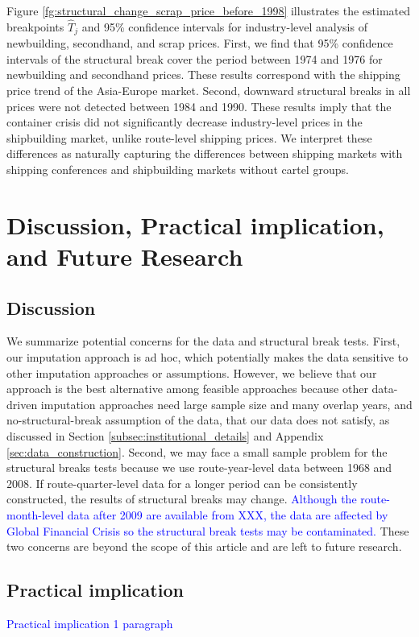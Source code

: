 \documentclass[11pt]{article}
\begin{document}
Figure \ref{fg:structural_change_scrap_price_before_1998} illustrates the estimated breakpoints $\hat{T}_j$ and 95\% confidence intervals for industry-level analysis of newbuilding, secondhand, and scrap prices. First, we find that 95\% confidence intervals of the structural break cover the period between 1974 and 1976 for newbuilding and secondhand prices. These results correspond with the shipping price trend of the Asia-Europe market. Second, downward structural breaks in all prices were not detected between 1984 and 1990. These results imply that the container crisis did not significantly decrease industry-level prices in the shipbuilding market, unlike route-level shipping prices. We interpret these differences as naturally capturing the differences between shipping markets with shipping conferences and shipbuilding markets without cartel groups.

\section{Discussion, Practical implication, and Future Research}

\subsection{Discussion}
We summarize potential concerns for the data and structural break tests. 
First, our imputation approach is ad hoc, which potentially makes the data sensitive to other imputation approaches or assumptions. 
However, we believe that our approach is the best alternative among feasible approaches because other data-driven imputation approaches need large sample size and many overlap years, and no-structural-break assumption of the data, that our data does not satisfy, as discussed in Section \ref{subsec:institutional_details} and Appendix \ref{sec:data_construction}. 
Second, we may face a small sample problem for the structural breaks tests because we use route-year-level data between 1968 and 2008. 
If route-quarter-level data for a longer period can be consistently constructed, the results of structural breaks may change. \textcolor{blue}{Although the route-month-level data after 2009 are available from XXX, the data are affected by Global Financial Crisis so the structural break tests may be contaminated.}
These two concerns are beyond the scope of this article and are left to future research.

\subsection{Practical implication}
\textcolor{blue}{Practical implication 1 paragraph}
\end{document}
